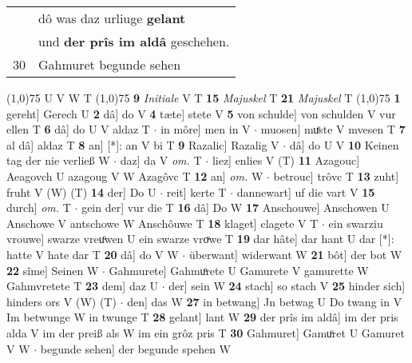 \documentclass[8pt,a4paper,notitlepage]{article}
\begin{document}
\begin{table}[ht]
\begin{minipage}[t]{0.5\linewidth}
\begin{tabular}{rl}
 & dô was daz urliuge \textbf{gelant}\\ 
 & und \textbf{der prîs im aldâ} geschehen.\\ 
30 & Gahmuret begunde sehen\\ 
\end{tabular}
\scriptsize
\line(1,0){75} \newline
U V W T \newline
\line(1,0){75} \newline
\textbf{9} \textit{Initiale} V T  \textbf{15} \textit{Majuskel} T  \textbf{21} \textit{Majuskel} T  \newline
\line(1,0){75} \newline
\textbf{1} gereht] Gerech U \textbf{2} dâ] do V \textbf{4} tæte] stete V \textbf{5} von schulde] von schulden V vur ellen T \textbf{6} dâ] do U V aldaz T  $\cdot$ in môre] men in V  $\cdot$ muosen] muͤste V mvesen T \textbf{7} al dâ] aldaz T \textbf{8} an] [*]: an V bi T \textbf{9} Razalic] Razalig V  $\cdot$ dâ] do U V \textbf{10} Keinen tag der nie verließ W  $\cdot$ daz] da V \textit{om.} T  $\cdot$ liez] enlies V (T) \textbf{11} Azagouc] Aeagovch U azagoug V W Azagôvc T \textbf{12} an] \textit{om.} W  $\cdot$ betrouc] trôvc T \textbf{13} zuht] fruht V (W) (T) \textbf{14} der] Do U  $\cdot$ reit] kerte T  $\cdot$ dannewart] uf die vart V \textbf{15} durch] \textit{om.} T  $\cdot$ gein der] vur die T \textbf{16} dâ] Do W \textbf{17} Anschouwe] Anschowen U Anschowe V antschowe W Anschôuwe T \textbf{18} klaget] clagete V T  $\cdot$ ein swarziu vrouwe] swarze vreuͦwen U ein swarze vroͮwe T \textbf{19} dar hâte] dar hant U dar [*]: hatte V hate dar T \textbf{20} dâ] do V W  $\cdot$ überwant] widerwant W \textbf{21} bôt] der bot W \textbf{22} sîme] Seinen W  $\cdot$ Gahmurete] Gahmuͦrete U Gamurete V gamurette W Gahmvretete T \textbf{23} dem] daz U  $\cdot$ der] sein W \textbf{24} stach] so stach V \textbf{25} hinder sich] hinders ors V (W) (T)  $\cdot$ den] das W \textbf{27} in betwang] Jn betwag U Do twang in V Im betwunge W in twunge T \textbf{28} gelant] lant W \textbf{29} der prîs im aldâ] im der pris alda V im der preiß als W im ein grôz pris T \textbf{30} Gahmuret] Gamuͦret U Gamuret V W  $\cdot$ begunde sehen] der begunde spehen W \newline
\end{minipage}
\end{table}
\end{document}
